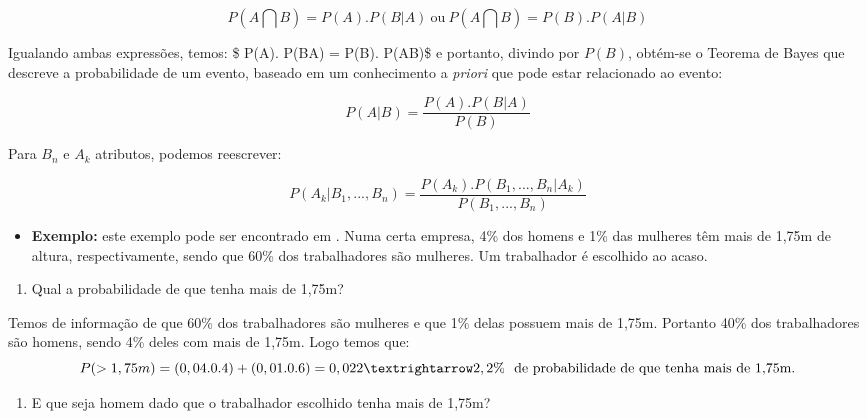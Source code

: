 \documentclass[
  openany]{book}
\providecommand{\tightlist}{%
  \setlength{\itemsep}{0pt}\setlength{\parskip}{0pt}}
\begin{document}
\begin{equation} 
 P(A \bigcap B)= P(A). P(B|A) \  \mbox{ou} \ P(A \bigcap B)= P(B). P(A|B)
  \label{eq:multprob}
\end{equation}

Igualando ambas expressões, temos: \$ P(A). P(B\textbar{}A) = P(B). P(A\textbar{}B)\$ e portanto, divindo por \(P(B)\), obtém-se o Teorema de Bayes que descreve a probabilidade de um evento, baseado em um conhecimento a \emph{priori} que pode estar relacionado ao evento:

\begin{equation} 
 P(A|B) = \frac{P(A).P(B|A)}{P(B)}
  \label{eq:bayes}
\end{equation}

Para \(B_n\) e \(A_k\) atributos, podemos reescrever:

\begin{equation} 
 P(A_k|B_1,...,B_n) = \frac{P(A_k).P(B_1,...,B_n|A_k)}{P(B_1,...,B_n)}
  \label{eq:bayesn}
\end{equation}

\begin{itemize}
\tightlist
\item
  \textbf{Exemplo:} este exemplo pode ser encontrado em \citet{freund2009estatistica}. Numa certa empresa, 4\% dos homens e 1\% das mulheres têm mais de 1,75m
  de altura, respectivamente, sendo que 60\% dos trabalhadores são mulheres. Um trabalhador é escolhido ao acaso.
\end{itemize}

\begin{enumerate}
\def\labelenumi{\arabic{enumi}.}
\tightlist
\item
  Qual a probabilidade de que tenha mais de 1,75m?
\end{enumerate}

Temos de informação de que 60\% dos trabalhadores são mulheres e que 1\% delas possuem mais de 1,75m. Portanto 40\% dos trabalhadores são homens, sendo 4\% deles com mais de 1,75m. Logo temos que:
\[P(> 1, 75m) = (0, 04 . 0.4) + (0, 01 . 0.6) = 0, 022 \\ → 2, 2\% \ \mbox{ de probabilidade de que tenha mais de 1,75m.}\]

\begin{enumerate}
\def\labelenumi{\arabic{enumi}.}
\setcounter{enumi}{1}
\tightlist
\item
  E que seja homem dado que o trabalhador escolhido tenha mais de 1,75m?
\end{enumerate}
\end{document}
